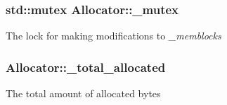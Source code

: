 \subsubsection[{\-\_\-mutex}]{\setlength{\rightskip}{0pt plus 5cm}std\-::mutex Allocator\-::\-\_\-mutex\hspace{0.3cm}{\ttfamily [private]}}\label{class_allocator_aba61a1bd22a0ba615f0c3030ca3a4b2a}
The lock for making modifications to {\itshape \-\_\-memblocks} 
\subsubsection[{\-\_\-total\-\_\-allocated}]{ Allocator\-::\-\_\-total\-\_\-allocated\hspace{0.3cm}{\ttfamily [private]}}\label{class_allocator_a3a87f7139ce300ab94ea2fb7748922e7}
The total amount of allocated bytes 